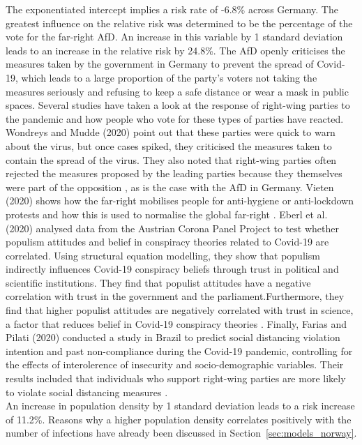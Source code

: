 The exponentiated intercept implies a risk rate of -6.8\% across Germany. The greatest influence on the relative risk was determined to be the percentage of the vote for the far-right AfD. An increase in this variable by 1 standard deviation leads to an increase in the relative risk by 24.8\%. The AfD openly criticises the measures taken by the government in Germany to prevent the spread of Covid-19, which leads to a large proportion of the party's voters not taking the measures seriously and refusing to keep a safe distance or wear a mask in public spaces. Several studies have taken a look at the response of right-wing parties to the pandemic and how people who vote for these types of parties have reacted. Wondreys and Mudde (2020) point out that these parties were quick to warn about the virus, but once cases spiked, they criticised the measures taken to contain the spread of the virus. They also noted that right-wing parties often rejected the measures proposed by the leading parties because they themselves were part of the opposition \autocite[][]{wondreys2020victims}, as is the case with the AfD in Germany. Vieten (2020) shows how the far-right mobilises people for anti-hygiene or anti-lockdown protests and how this is used to normalise the global far-right \autocite[][]{vieten2020new}. Eberl et al. (2020) analysed data from the Austrian Corona Panel Project to test whether populism attitudes and belief in conspiracy theories related to Covid-19 are correlated. Using structural equation modelling, they show that populism indirectly influences Covid-19 conspiracy beliefs through trust in political and scientific institutions. They find that populist attitudes have a negative correlation with trust in the government and the parliament.Furthermore, they find that higher populist attitudes are negatively correlated with trust in science, a factor that reduces belief in Covid-19 conspiracy theories \autocite[][]{eberl2020populism}. Finally, Farias and Pilati (2020) conducted a study in Brazil to predict social distancing violation intention and past non-compliance during the Covid-19 pandemic, controlling for the effects of interolerence of insecurity and socio-demographic variables. Their results included that individuals who support right-wing parties are more likely to violate social distancing measures \autocite[][]{farias2020violating}. \\
An increase in population density by 1 standard deviation leads to a risk increase of 11.2\%. Reasons why a higher population density correlates positively with the number of infections have already been discussed in Section~\ref{sec:models_norway}. \\
